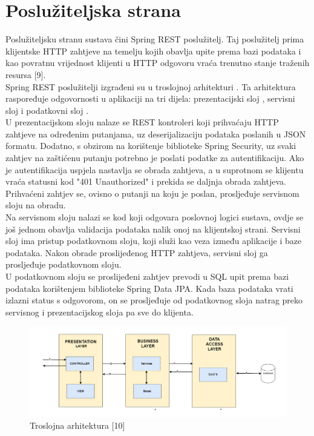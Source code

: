 \documentclass[times, utf8, zavrsni]{fer}
\begin{document}
\section{Poslužiteljska strana}
Poslužiteljsku stranu sustava čini Spring REST poslužitelj. Taj poslužitelj prima klijentske HTTP zahtjeve na temelju kojih obavlja upite prema bazi podataka i kao povratnu vrijednost klijenti u HTTP odgovoru vraća trenutno stanje traženih resursa [9].\\
%
\indent{}
Spring REST poslužitelji izgrađeni su u troslojnoj arhitekturi . Ta arhitektura raspoređuje odgovornosti u aplikaciji na tri dijela: prezentacijski sloj , servisni sloj  i podatkovni sloj .\\
%
\indent{}
U prezentacijskom sloju nalaze se REST kontroleri koji prihvaćaju HTTP zahtjeve na određenim putanjama, uz deserijalizaciju podataka poslanih u JSON formatu. Dodatno, s obzirom na korištenje biblioteke Spring Security, uz svaki zahtjev na zaštićenu putanju potrebno je poslati podatke za autentifikaciju. Ako je autentifikacija uspjela nastavlja se obrada zahtjeva, a u suprotnom se klijentu vraća statusni kod "401 Unauthorized" i prekida se daljnja obrada zahtjeva. Prihvaćeni zahtjev se, ovisno o putanji na koju je poslan, prosljeđuje servisnom sloju na obradu.\\
%
\indent{}
Na servisnom sloju nalazi se kod koji odgovara poslovnoj logici sustava, ovdje se još jednom obavlja validacija podataka nalik onoj na klijentskoj strani. Servisni sloj ima pristup podatkovnom sloju, koji služi kao veza između aplikacije i baze podataka. Nakon obrade proslijeđenog HTTP zahtjeva, servisni sloj ga prosljeđuje podatkovnom sloju.\\
%
\indent{}
U podatkovnom sloju se proslijeđeni zahtjev prevodi u SQL upit prema bazi podataka korištenjem biblioteke Spring Data JPA. Kada baza podataka vrati izlazni status s odgovorom, on se prosljeđuje od podatkovnog sloja natrag preko servisnog i prezentacijskog sloja pa sve do klijenta.
%
\begin{figure}[!h]
\centering
\includegraphics[width=1\textwidth]{./slike/springArch}
\caption{Troslojna arhitektura [10]}
\label{fig:springArch}
\end{figure}
\end{document}
